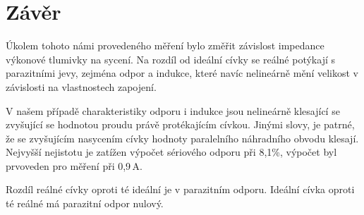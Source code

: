 \documentclass[a4paper, czech]{article}
\begin{document}
\section{Závěr}

Úkolem tohoto námi provedeného měření bylo změřit závislost impedance výkonové tlumivky na sycení.
Na rozdíl od ideální cívky se reálné potýkají s parazitními jevy, zejména odpor a indukce, které navíc nelineárně mění velikost v závislosti na vlastnostech zapojení.

V našem případě charakteristiky odporu i indukce jsou nelineárně klesající se zvyšující se hodnotou proudu právě protékajícím cívkou.
Jinými slovy, je patrné, že se zvyšujícím nasycením cívky hodnoty paralelního náhradního obvodu klesají.
Nejvyšší nejistotu je zatížen výpočet sériového odporu při 8,1\%, výpočet byl prvoveden pro měření při 0,9\,A.

Rozdíl reálné cívky oproti té ideální je v parazitním odporu. Ideální cívka oproti té reálné má parazitní odpor nulový.
\end{document}
